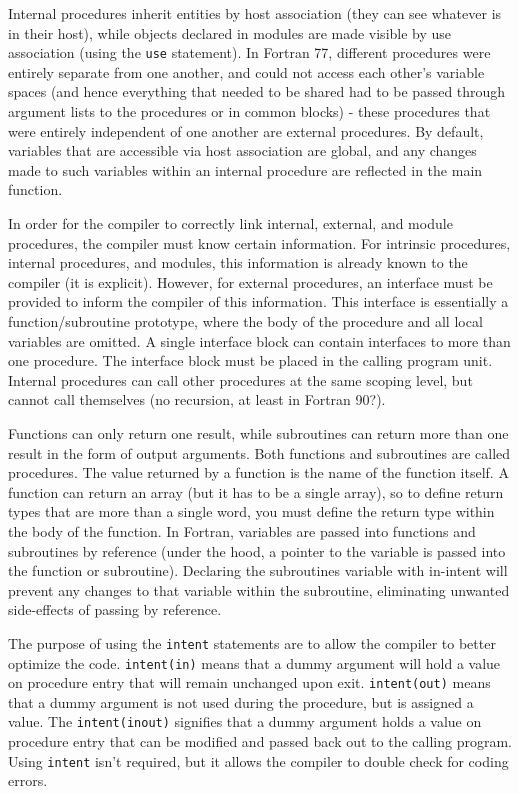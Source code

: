 \documentclass[10pt]{article}
\begin{document}
Internal procedures inherit entities by host association (they can see whatever is in their host), while objects declared in modules are made visible by use association (using the {\tt use} statement). In Fortran 77, different procedures were entirely separate from one another, and could not access each other's variable spaces (and hence everything that needed to be shared had to be passed through argument lists to the procedures or in common blocks) - these procedures that were entirely independent of one another are external procedures. By default, variables that are accessible via host association are global, and any changes made to such variables within an internal procedure are reflected in the main function.

In order for the compiler to correctly link internal, external, and module procedures, the compiler must know certain information. For intrinsic procedures, internal procedures, and modules, this information is already known to the compiler (it is explicit). However, for external procedures, an interface must be provided to inform the compiler of this information. This interface is essentially a function/subroutine prototype, where the body of the procedure and all local variables are omitted. A single interface block can contain interfaces to more than one procedure. The interface block must be placed in the calling program unit. Internal procedures can call other procedures at the same scoping level, but cannot call themselves (no recursion, at least in Fortran 90?).

Functions can only return one result, while subroutines can return more than one result in the form of output arguments. Both functions and subroutines are called procedures. The value returned by a function is the name of the function itself. A function can return an array (but it has to be a single array), so to define return types that are more than a single word, you must define the return type within the body of the function. In Fortran, variables are passed into functions and subroutines by reference (under the hood, a pointer to the variable is passed into the function or subroutine). Declaring the subroutines variable with in-intent will prevent any changes to that variable within the subroutine, eliminating unwanted side-effects of passing by reference.

The purpose of using the {\tt intent} statements are to allow the compiler to better optimize the code. {\tt intent(in)} means that a dummy argument will hold a value on procedure entry that will remain unchanged upon exit. {\tt intent(out)} means that a dummy argument is not used during the procedure, but is assigned a value. The {\tt intent(inout)} signifies that a dummy argument holds a value on procedure entry that can be modified and passed back out to the calling program. Using {\tt intent} isn't required, but it allows the compiler to double check for coding errors. 
\end{document}
